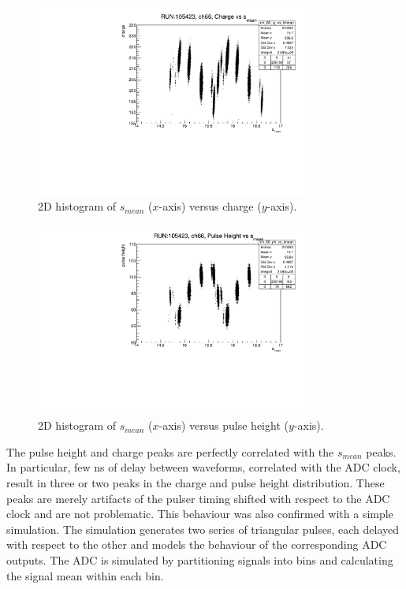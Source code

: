 \begin{figure}[!h]
  \centering
  \includegraphics[width=0.8\textwidth]{figures/pdf/chtmean.pdf}
  \caption{2D histogram of $s_{mean}$ ($x$-axis) versus charge ($y$-axis).}
  \label{fig:chtm}
\end{figure}
\begin{figure}[!h]
  \centering
  \includegraphics[width=0.8\textwidth]{figures/pdf/phtmean1.pdf}
  \caption{2D histogram of $s_{mean}$ ($x$-axis) versus pulse height ($y$-axis).}
  \label{fig:phtm}
\end{figure}
The pulse height and charge peaks are perfectly correlated with the $s_{mean}$ peaks. 
In particular, few ns of delay between waveforms, correlated with the ADC clock, 
result in three or two peaks in the charge and pulse height distribution. 
These peaks are merely artifacts of the pulser timing shifted with respect to the ADC 
clock and are not problematic. This behaviour was also confirmed with a simple simulation.
The simulation generates two series of triangular pulses, each delayed with respect to the other and models the behaviour 
of the corresponding ADC outputs. The ADC is simulated by partitioning signals into bins and calculating the signal mean within each bin. 
